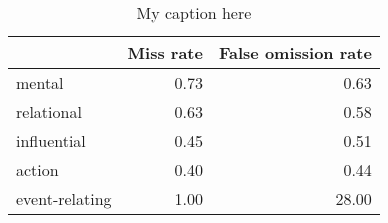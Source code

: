 \begin{table}[!ht]
\centering
\begin{tabular}{lrr}
\toprule
{} &  Miss rate &  False omission rate \\
\midrule
mental         &       0.73 &                 0.63 \\
relational     &       0.63 &                 0.58 \\
influential    &       0.45 &                 0.51 \\
action         &       0.40 &                 0.44 \\
event-relating &       1.00 &                28.00 \\
\bottomrule
\end{tabular}
\caption{My caption here}
\label{tab:PROCESS_TYPE-oe-combined-errors}
\end{table}